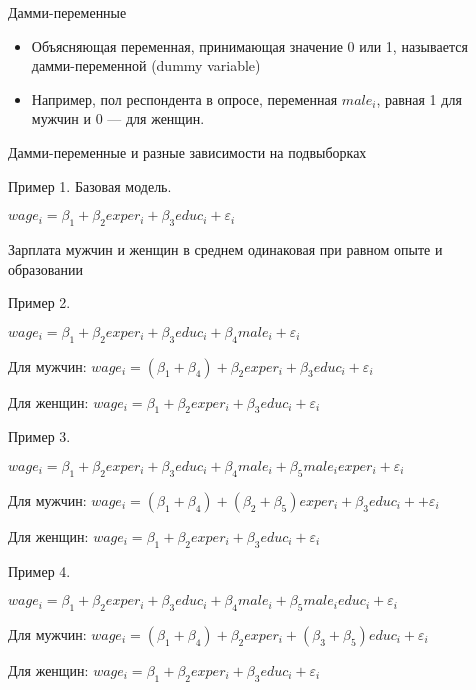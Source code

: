 \documentclass[russian,ignorenonframetext,]{beamer}
\begin{document}
\begin{frame}{Дамми-переменные}

\begin{itemize}
\item
  Объясняющая переменная, принимающая значение 0 или 1, называется
  дамми-переменной (dummy variable)
\item
  Например, пол респондента в опросе, переменная \(male_i\), равная 1
  для мужчин и 0 --- для женщин.
\end{itemize}

\end{frame}

\begin{frame}{Дамми-переменные и разные зависимости на подвыборках}

Пример 1. Базовая модель.

\(wage_i = \beta_1 + \beta_2 exper_i + \beta_3 educ_i + \varepsilon_i\)

Зарплата мужчин и женщин в среднем одинаковая при равном опыте и
образовании

\end{frame}

\begin{frame}{Пример 2.}

\(wage_i = \beta_1 + \beta_2 exper_i + \beta_3 educ_i + \beta_4 male_i + \varepsilon_i\)

Для мужчин:
\(wage_i = (\beta_1+\beta_4) + \beta_2 exper_i + \beta_3 educ_i + \varepsilon_i\)

Для женщин:
\(wage_i = \beta_1 + \beta_2 exper_i + \beta_3 educ_i + \varepsilon_i\)

\end{frame}

\begin{frame}{Пример 3.}

\(wage_i = \beta_1 + \beta_2 exper_i + \beta_3 educ_i + \beta_4 male_i + \beta_5 male_i exper_i + \varepsilon_i\)

Для мужчин:
\(wage_i = (\beta_1+\beta_4) + (\beta_2+\beta_5) exper_i + \beta_3 educ_i + + \varepsilon_i\)

Для женщин:
\(wage_i = \beta_1 + \beta_2 exper_i + \beta_3 educ_i + \varepsilon_i\)

\end{frame}

\begin{frame}{Пример 4.}

\(wage_i = \beta_1 + \beta_2 exper_i + \beta_3 educ_i + \beta_4 male_i + \beta_5 male_i educ_i + \varepsilon_i\)

Для мужчин:
\(wage_i = (\beta_1+\beta_4) + \beta_2 exper_i + (\beta_3 + \beta_5) educ_i + \varepsilon_i\)

Для женщин:
\(wage_i = \beta_1 + \beta_2 exper_i + \beta_3 educ_i + \varepsilon_i\)

\end{frame}
\end{document}
